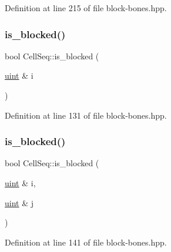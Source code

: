 Definition at line 215 of file block-\/bones.\+hpp.

\mbox{\label{class_cell_seq_a994900efdcf73e7619f728d584e92c5a}} 
\subsubsection{\texorpdfstring{is\+\_\+blocked()}{is\_blocked()}\hspace{0.1cm}{\footnotesize\ttfamily [1/2]}}
{\footnotesize\ttfamily bool Cell\+Seq\+::is\+\_\+blocked (\begin{DoxyParamCaption}\item[{\hyperlink{typedefs_8hpp_a91ad9478d81a7aaf2593e8d9c3d06a14}{uint} \&}]{i }\end{DoxyParamCaption})\hspace{0.3cm}{\ttfamily [inline]}}



Definition at line 131 of file block-\/bones.\+hpp.

\mbox{\label{class_cell_seq_a5a5730ec094c9a4251753302a9504149}} 
\subsubsection{\texorpdfstring{is\+\_\+blocked()}{is\_blocked()}\hspace{0.1cm}{\footnotesize\ttfamily [2/2]}}
{\footnotesize\ttfamily bool Cell\+Seq\+::is\+\_\+blocked (\begin{DoxyParamCaption}\item[{\hyperlink{typedefs_8hpp_a91ad9478d81a7aaf2593e8d9c3d06a14}{uint} \&}]{i,  }\item[{\hyperlink{typedefs_8hpp_a91ad9478d81a7aaf2593e8d9c3d06a14}{uint} \&}]{j }\end{DoxyParamCaption})\hspace{0.3cm}{\ttfamily [inline]}}



Definition at line 141 of file block-\/bones.\+hpp.

\mbox{\label{class_cell_seq_a05687b1000bcce13c0f81c0203363ce7}} 

